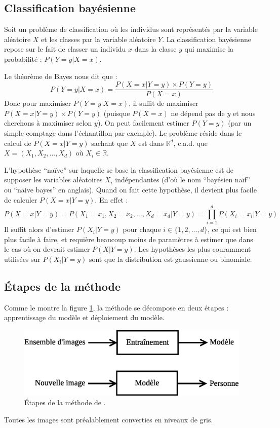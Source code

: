 \subsection{Classification bayésienne}
Soit un problème de classification où les individus sont représentés
par la variable aléatoire $X$ et les classes par la variable aléatoire $Y$.
La classification bayésienne repose sur le fait de classer un individu $x$ dans la
classe $y$ qui maximise la probabilité : $P(Y=y|X=x)$.

Le théorème de Bayes nous dit que :
\[
    P(Y=y|X=x) = \frac{P(X=x|Y=y) \times P(Y=y)}{P(X=x)}
\]
Donc pour maximiser $P(Y=y|X=x)$, il suffit de maximiser $P(X=x|Y=y) \times P(Y=y)$
(puisque $P(X=x)$ ne dépend pas de $y$ et nous cherchons à maximiser selon $y$).
On peut facilement estimer $P(Y=y)$ (par un simple comptage dans l'échantillon par exemple).
Le problème réside dans le calcul de $P(X=x|Y=y)$ sachant que $X$ est dans $\mathbb{R}^d$, 
c.a.d. que $X = (X_1, X_2, ..., X_d)$ où $X_i \in \mathbb{R}$.

L'hypothèse ``naïve'' sur laquelle se base la classification bayésienne est de supposer
les variables aléatoires $X_i$ indépendantes (d'où le nom ``bayésien naïf'' ou ``naive bayes''
en anglais). Quand on fait cette hypothèse, il devient plus facile de calculer $P(X=x|Y=y)$.
En effet :
\[
    P(X=x|Y=y) = P(X_1=x_1, X_2=x_2, ..., X_d=x_d|Y=y) = \prod_{i=1}^d P(X_i=x_i|Y=y)
\]
Il suffit alors d'estimer $P(X_i|Y=y)$ pour chaque $i \in \{1, 2, ..., d\}$, ce qui est bien
plus facile à faire, et requière beaucoup moins de paramètres à estimer que dans le cas où
on devrait estimer $P(X|Y=y)$. Les hypothèses les plus couramment utilisées sur $P(X_i|Y=y)$
sont que la distribution est gaussienne ou binomiale.


\subsection{Étapes de la méthode}
Comme le montre la figure \ref{fig:article:etapes}, la méthode se décompose en deux 
étapes : apprentissage du modèle et déploiement du modèle.
\begin{figure}[H]
    \centering
    \includegraphics[scale=0.5]{images/article_etapes}
    \caption{Étapes de la méthode de \cite{article}.}
    \label{fig:article:etapes}
\end{figure}
Toutes les images sont préalablement converties en niveaux de gris.

